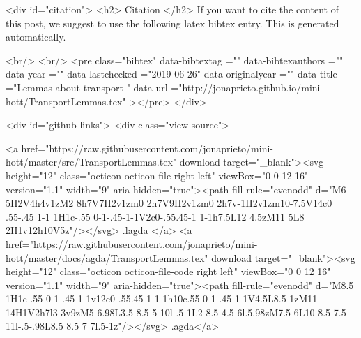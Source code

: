 {{  
  <div id="citation">
  <h2> Citation </h2>
  If you want to cite the content of this post,
  we suggest to use the following latex bibtex entry.
  This is generated automatically.

  <br/>
  <br/>
  <pre class="bibtex"
       data-bibtextag =""
       data-bibtexauthors =""
       data-year =""
       data-lastchecked ="2019-06-26"
       data-originalyear =""
       data-title ="Lemmas about transport "
       data-url ="http://jonaprieto.github.io/mini-hott/TransportLemmas.tex"
  ></pre>
  </div>
  

  <div id="github-links">
    <div class="view-source">
      
        <a href="https://raw.githubusercontent.com/jonaprieto/mini-hott/master/src/TransportLemmas.tex" download target="_blank"><svg height="12" class="octicon octicon-file right left" viewBox="0 0 12 16" version="1.1" width="9" aria-hidden="true"><path fill-rule="evenodd" d="M6 5H2V4h4v1zM2 8h7V7H2v1zm0 2h7V9H2v1zm0 2h7v-1H2v1zm10-7.5V14c0 .55-.45 1-1 1H1c-.55 0-1-.45-1-1V2c0-.55.45-1 1-1h7.5L12 4.5zM11 5L8 2H1v12h10V5z"/></svg> .lagda </a>
        <a href="https://raw.githubusercontent.com/jonaprieto/mini-hott/master/docs/agda/TransportLemmas.tex" download target="_blank"><svg height="12" class="octicon octicon-file-code right left" viewBox="0 0 12 16" version="1.1" width="9" aria-hidden="true"><path fill-rule="evenodd" d="M8.5 1H1c-.55 0-1 .45-1 1v12c0 .55.45 1 1 1h10c.55 0 1-.45 1-1V4.5L8.5 1zM11 14H1V2h7l3 3v9zM5 6.98L3.5 8.5 5 10l-.5 1L2 8.5 4.5 6l.5.98zM7.5 6L10 8.5 7.5 11l-.5-.98L8.5 8.5 7 7l.5-1z"/></svg> .agda</a>
      
}}
